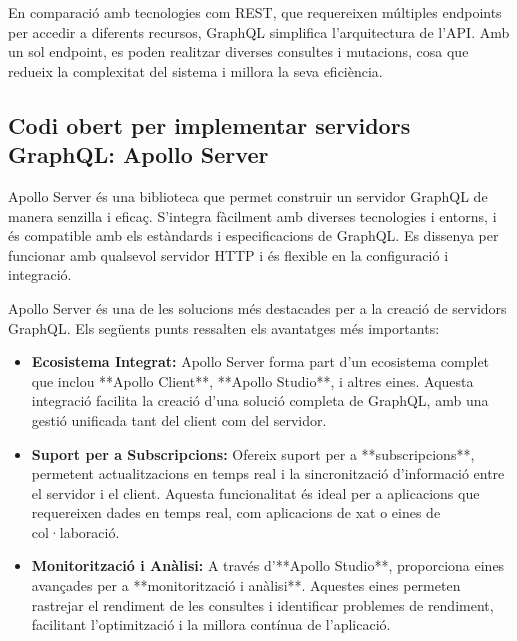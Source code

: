 \documentclass[a4paper,12pt,twoside]{ThesisStyle}
\begin{document}
En comparació amb tecnologies com REST, que requereixen múltiples endpoints per accedir a diferents recursos, GraphQL simplifica l'arquitectura de l'API. Amb un sol endpoint, es poden realitzar diverses consultes i mutacions, cosa que redueix la complexitat del sistema i millora la seva eficiència.\\



\subsection{Codi obert per implementar servidors GraphQL: Apollo Server}
\label{Codi obert per implementar servidors GraphQL: Apollo Server}

Apollo Server és una biblioteca que permet construir un servidor GraphQL de manera senzilla i eficaç. S'integra fàcilment amb diverses tecnologies i entorns, i és compatible amb els estàndards i especificacions de GraphQL. Es dissenya per funcionar amb qualsevol servidor HTTP i és flexible en la configuració i integració.

Apollo Server és una de les solucions més destacades per a la creació de servidors GraphQL. Els següents punts ressalten els avantatges més importants:

\begin{itemize}
    \item \textbf{Ecosistema Integrat:} Apollo Server forma part d'un ecosistema complet que inclou **Apollo Client**, **Apollo Studio**, i altres eines. Aquesta integració facilita la creació d'una solució completa de GraphQL, amb una gestió unificada tant del client com del servidor.
    
    \item \textbf{Suport per a Subscripcions:} Ofereix suport per a **subscripcions**, permetent actualitzacions en temps real i la sincronització d'informació entre el servidor i el client. Aquesta funcionalitat és ideal per a aplicacions que requereixen dades en temps real, com aplicacions de xat o eines de col·laboració.
    
    \item \textbf{Monitorització i Anàlisi:} A través d'**Apollo Studio**, proporciona eines avançades per a **monitorització i anàlisi**. Aquestes eines permeten rastrejar el rendiment de les consultes i identificar problemes de rendiment, facilitant l'optimització i la millora contínua de l'aplicació.
\end{itemize}
\end{document}
